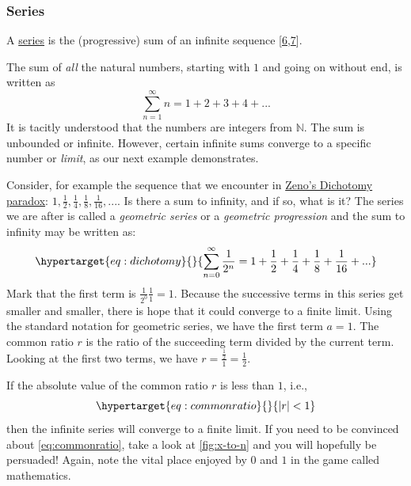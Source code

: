 \documentclass[
  a4paper,
]{article}
\begin{document}
\hypertarget{series}{%
\subsubsection{Series}\label{series}}

A \href{https://mathworld.wolfram.com/Series.html}{series} is the
(progressive) sum of an infinite sequence
{[}\protect\hyperlink{ref-wikiseries}{6},\protect\hyperlink{ref-wolframseries}{7}{]}.

The sum of \emph{all} the natural numbers, starting with \(1\) and going
on without end, is written as \[
\sum_{n = 1}^{\infty}n = 1 + 2 + 3 + 4 + ...
\] It is tacitly understood that the numbers are integers from
\(\mathbb{N}\). The sum is unbounded or infinite. However, certain
infinite sums converge to a specific number or \emph{limit}, as our next
example demonstrates.

Consider, for example the sequence that we encounter in
\href{https://en.wikipedia.org/wiki/Zeno\%27s_paradoxes}{Zeno's
Dichotomy paradox}:
\(1, \frac{1}{2}, \frac{1}{4}, \frac{1}{8}, \frac{1}{16}, ...\). Is
there a sum to infinity, and if so, what is it? The series we are after
is called a \emph{geometric series} or a \emph{geometric progression}
and the sum to infinity may be written as:
\begin{equation}\protect\hypertarget{eq:dichotomy}{}{
\sum_{n = 0}^{\infty}\frac{1}{2^{n}} = 1 + \frac{1}{2} + \frac{1}{4} + \frac{1}{8} +
\frac{1}{16} + ...
}\label{eq:dichotomy}\end{equation} Mark that the first term is
\(\frac{1}{2^0} \frac{1}{1} = 1\). Because the successive terms in this
series get smaller and smaller, there is hope that it could converge to
a finite limit. Using the standard notation for geometric series, we
have the first term \(a = 1\). The common ratio \(r\) is the ratio of
the succeeding term divided by the current term. Looking at the first
two terms, we have \(r = \frac{\frac{1}{2}}{1} = \frac{1}{2}\).

If the absolute value of the common ratio \(r\) is less than \(1\),
i.e.,
\begin{equation}\protect\hypertarget{eq:commonratio}{}{\lvert{r}\rvert < 1
}\label{eq:commonratio}\end{equation} then the infinite series will
converge to a finite limit. If you need to be convinced about
\cref{eq:commonratio}, take a look at \cref{fig:x-to-n} and you will
hopefully be persuaded! Again, note the vital place enjoyed by \(0\) and
\(1\) in the game called mathematics. \normalfont
\end{document}
